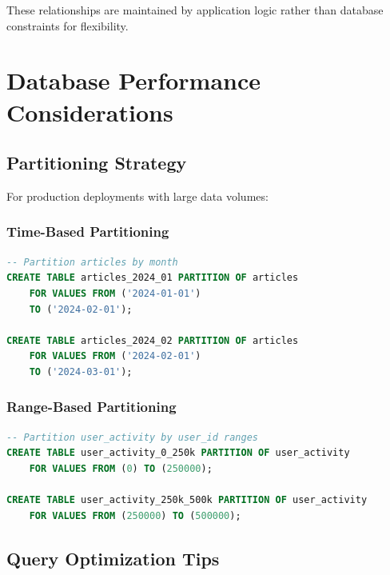 \documentclass[12pt,a4paper]{report}
\begin{document}
These relationships are maintained by application logic rather than database constraints for flexibility.

\newpage

\chapter{Database Performance Considerations}

\section{Partitioning Strategy}

For production deployments with large data volumes:

\subsection{Time-Based Partitioning}

\begin{lstlisting}[language=SQL,basicstyle=\ttfamily\small]
-- Partition articles by month
CREATE TABLE articles_2024_01 PARTITION OF articles
    FOR VALUES FROM ('2024-01-01') 
    TO ('2024-02-01');

CREATE TABLE articles_2024_02 PARTITION OF articles
    FOR VALUES FROM ('2024-02-01') 
    TO ('2024-03-01');
\end{lstlisting}

\subsection{Range-Based Partitioning}

\begin{lstlisting}[language=SQL,basicstyle=\ttfamily\small]
-- Partition user_activity by user_id ranges
CREATE TABLE user_activity_0_250k PARTITION OF user_activity
    FOR VALUES FROM (0) TO (250000);

CREATE TABLE user_activity_250k_500k PARTITION OF user_activity
    FOR VALUES FROM (250000) TO (500000);
\end{lstlisting}

\section{Query Optimization Tips}
\end{document}
